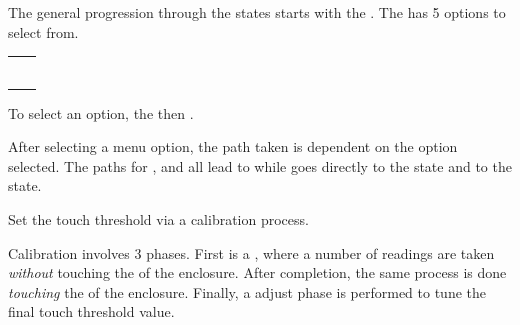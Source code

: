  \par\medskip

The general progression through the states starts with the .  The
 has \num{5} options to select from.

\begin{table}[H]
\centering
\begin{tabu}{c c}
   &  \\ \mrule
   &  \\
   &  \\
   &  \\
   &  \\
   & 
\end{tabu}
\end{table}

To select an option,  the  then .


After selecting a menu option, the path taken is dependent on the option
selected.  The paths for ,  and  all lead to
 while  goes directly to the  state and  to
the  state.


 \par\medskip

Set the touch threshold via a calibration process.

\par\medskip

Calibration involves \num{3} phases.  First is a , where a number of
readings are taken \textit{without} touching the  of the enclosure.
After completion, the same process is done \textit{touching} the  of the
enclosure.  Finally, a  adjust phase is performed to tune the final
touch threshold value.

